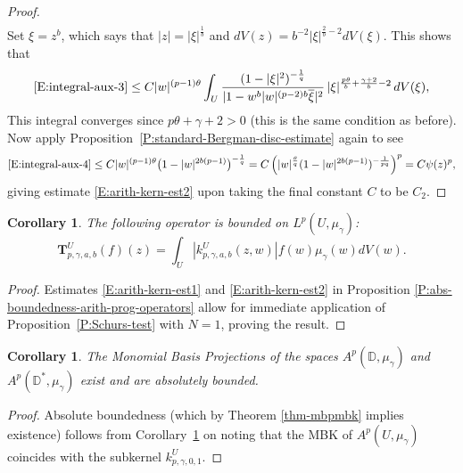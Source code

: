 \documentclass[letterpaper,11pt,reqno]{amsart}
\theoremstyle{plain}
\newtheorem{corollary}[equation]{Corollary}
\theoremstyle{definition}
\theoremstyle{remark}
\theoremstyle{remark}
\numberwithin{equation}{section}
\newcommand{\ol}{\overline}
\newcommand{\mug}{{\mu_{\gamma}}}
\newcommand{\D}{{\mathbb D}}
\begin{document}
\begin{proof}
\begin{align}
\end{align}
Set $\xi = z^b$, which says that $|z| = |\xi|^{\frac{1}{b}}$ and $dV(z) = b^{-2}|\xi|^{\frac{2}{b}-2}dV(\xi)$. 
This shows that
\begin{align}\label{E:integral-aux-4}
\eqref{E:integral-aux-3} \le C |w|^{(p-1)\theta}\int_{U} \frac{(1-|\xi|^{2})^{-\frac{1}{q}}}{|1- w^b|w|^{(p-2)b}\ol{\xi}|^2}\,|\xi|^{\frac{p\theta}{b}+\frac{\gamma+2}{b}-2}\,dV(\xi),
\end{align}
This integral converges since $p\theta + \gamma + 2 > 0$ (this is the same condition as before). 
Now apply Proposition~\ref{P:standard-Bergman-disc-estimate} again to see
\begin{equation*}\eqref{E:integral-aux-4} 
\le C |w|^{(p-1)\theta}\big(1-|w|^{2b(p-1)}\big)^{-\frac{1}{q}} 
= C\left( |w|^{\frac{\theta}{q}}(1-|w|^{2b(p-1)})^{-\frac{1}{pq}} \right)^p
= C \psi(z)^p,
\end{equation*}
giving estimate \eqref{E:arith-kern-est2} upon taking the final constant $C$ to be $C_2$.
\end{proof}
 
\begin{corollary}\label{C:abs-subprojections-on-U}
The following operator is bounded on $L^p(U,\mug)$:
\begin{equation}\label{E:absolute-mbp-def-1-dim}
\bm{T}^{U}_{p,\gamma,a,b}(f)(z) = \int_U \left|k^{U}_{p,\gamma,a,b}(z,w) \right|f(w)\mug(w)dV(w).
\end{equation}
\end{corollary}
\begin{proof}
Estimates \eqref{E:arith-kern-est1} and \eqref{E:arith-kern-est2} in Proposition \ref{P:abs-boundedness-arith-prog-operators} allow for immediate application of Proposition~\ref{P:Schurs-test} with $N=1$, proving the result.
\end{proof}

\begin{corollary}\label{C:AMBO-MBP-existence-on-U}
The Monomial Basis Projections of the spaces $A^p(\D,\mug)$ and $A^p(\D^*,\mug)$ exist and are absolutely bounded.
\end{corollary}
\begin{proof}
Absolute boundedness (which by Theorem \ref{thm-mbpmbk} implies existence) follows from Corollary~\ref{C:abs-subprojections-on-U} on noting that the MBK of $A^p(U,\mug)$ coincides with the subkernel $k^{U}_{p,\gamma,0,1}$.
\end{proof}

\end{document}
